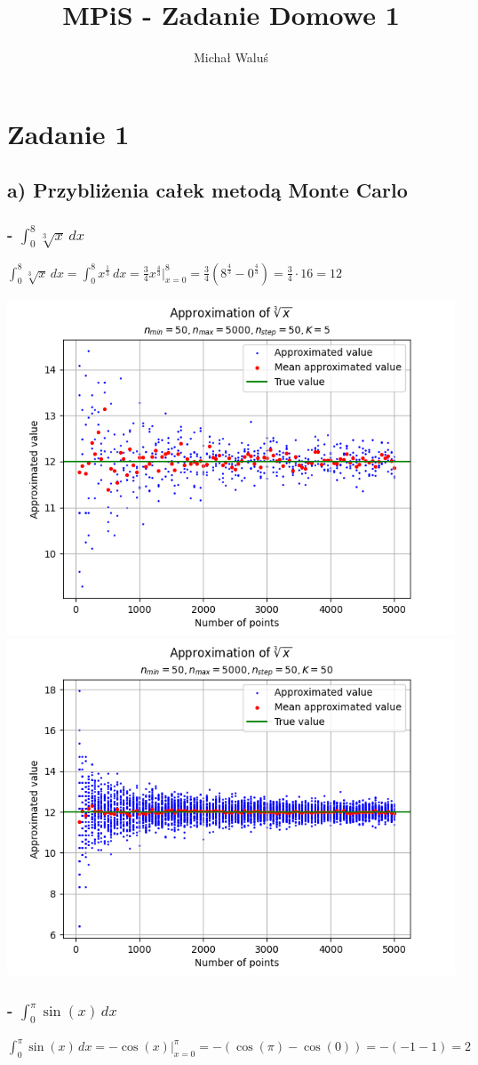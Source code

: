 \documentclass[12pt, a4paper]{article}
\title{MPiS - Zadanie Domowe 1}
\author{Michał Waluś}
\begin{document}
\maketitle

\section*{Zadanie 1}
\subsection*{a) Przybliżenia całek metodą Monte Carlo}

\subsubsection*{- $\int_0^8 \sqrt[3]{x} \,dx$}

$\int_0^8 \sqrt[3]{x} \,dx = \int_0^8 x^{\frac{1}{3}} \,dx = \frac{3}{4}x^{\frac{4}{3}} \Big\vert_{x=0}^8 = \frac{3}{4} \left(8^{\frac{4}{3}} - 0^{\frac{4}{3}} \right) = \frac{3}{4} \cdot 16 = 12$

\includegraphics[width=0.48\linewidth]{f1k1.png}
\includegraphics[width=0.48\linewidth]{f1k2.png}

\subsubsection*{- $\int_0^{\pi} \sin(x) \,dx$}

$\int_0^{\pi} \sin(x) \,dx = -\cos(x) \Big\vert_{x=0}^{\pi} = -\left( \cos(\pi) - \cos(0) \right) = - \left( -1 - 1 \right) = 2$
\end{document}

